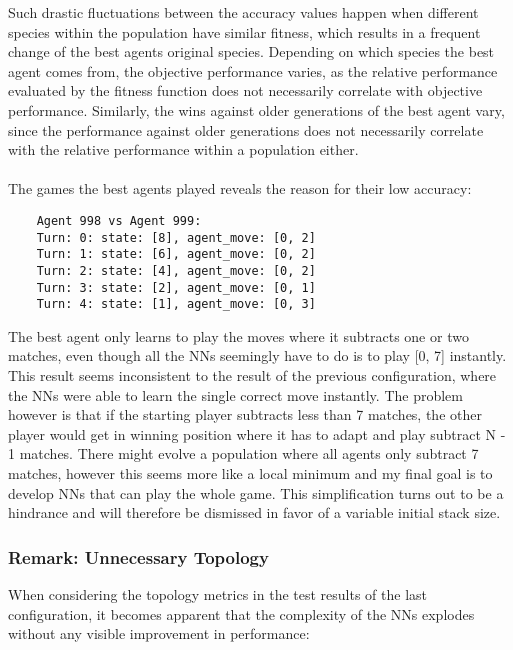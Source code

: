 Such drastic fluctuations between the accuracy values happen when different species within the population have similar fitness, which results in a frequent change of the best agents original species.
Depending on which species the best agent comes from, the objective performance varies, as the relative performance evaluated by the fitness function does not necessarily correlate with objective performance.
Similarly, the wins against older generations of the best agent vary, since the performance against older generations does not necessarily correlate with the relative performance within a population either.
\\ \\
The games the best agents played reveals the reason for their low accuracy:
\begin{verbatim}
    Agent 998 vs Agent 999:
    Turn: 0: state: [8], agent_move: [0, 2]
    Turn: 1: state: [6], agent_move: [0, 2]
    Turn: 2: state: [4], agent_move: [0, 2]
    Turn: 3: state: [2], agent_move: [0, 1]
    Turn: 4: state: [1], agent_move: [0, 3]
\end{verbatim}
The best agent only learns to play the moves where it subtracts one or two matches, even though all the NNs seemingly have to do is to play [0, 7] instantly.
This result seems inconsistent to the result of the previous configuration, where the NNs were able to learn the single correct move instantly.
The problem however is that if the starting player subtracts less than 7 matches, the other player would get in winning position where it has to adapt and play subtract N - 1 matches.
There might evolve a population where all agents only subtract 7 matches, however this seems more like a local minimum and my final goal is to develop NNs that can play the whole game.
This simplification turns out to be a hindrance and will therefore be dismissed in favor of a variable initial stack size.

\subsubsection{Remark: Unnecessary Topology}
When considering the topology metrics in the test results of the last configuration, it becomes apparent that the complexity of the NNs explodes without any visible improvement in performance:
\renewcommand{\csvpath}{../data/simple_nim/stack_8/t_1/stats.csv} %


